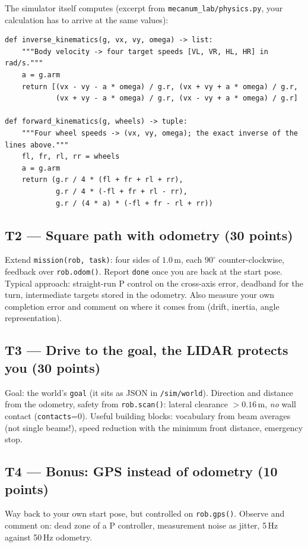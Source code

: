 \documentclass[12pt,a4paper]{scrartcl}
\newcommand{\thema}[1]{\texttt{#1}}
\newcommand{\ordner}[1]{\texttt{#1}}
\begin{document}
The simulator itself computes (excerpt from \ordner{mecanum\_lab/physics.py}, your
calculation has to arrive at the same values):
\begin{lstlisting}
def inverse_kinematics(g, vx, vy, omega) -> list:
    """Body velocity -> four target speeds [VL, VR, HL, HR] in rad/s."""
    a = g.arm
    return [(vx - vy - a * omega) / g.r, (vx + vy + a * omega) / g.r,
            (vx + vy - a * omega) / g.r, (vx - vy + a * omega) / g.r]

def forward_kinematics(g, wheels) -> tuple:
    """Four wheel speeds -> (vx, vy, omega); the exact inverse of the lines above."""
    fl, fr, rl, rr = wheels
    a = g.arm
    return (g.r / 4 * (fl + fr + rl + rr),
            g.r / 4 * (-fl + fr + rl - rr),
            g.r / (4 * a) * (-fl + fr - rl + rr))
\end{lstlisting}

\subsection*{T2 — Square path with odometry (30 points)}
Extend \thema{mission(rob, task)}: four sides of \(1.0\,\mathrm{m}\), each
\(90^\circ\) counter-clockwise, feedback over \thema{rob.odom()}.
Report \thema{done} once you are back at the start pose. Typical approach:
straight-run P control on the cross-axis error, deadband for the turn,
intermediate targets stored in the odometry. Also measure your own
completion error and comment on where it comes from (drift, inertia, angle
representation).

\subsection*{T3 — Drive to the goal, the LIDAR protects you (30 points)}
Goal: the world's \thema{goal} (it sits as JSON in \thema{/sim/world}). Direction and
distance from the odometry, safety from \thema{rob.scan()}: lateral clearance
\(>0.16\,\mathrm{m}\), \emph{no} wall contact (\thema{contacts}=0). Useful
building blocks: vocabulary from beam averages (not single beams!),
speed reduction with the minimum front distance, emergency stop.

\subsection*{T4 — Bonus: GPS instead of odometry (10 points)}
Way back to your own start pose, but controlled on \thema{rob.gps()}. Observe and
comment on: dead zone of a P controller, measurement noise as jitter, 5\,Hz against
50\,Hz odometry.
\end{document}

